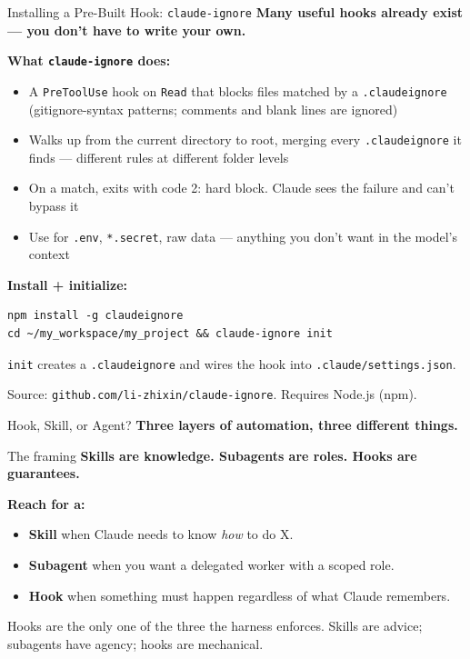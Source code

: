 \documentclass[aspectratio=169, 11pt]{beamer}
\begin{document}
\begin{frame}[fragile]{Installing a Pre-Built Hook: \texttt{claude-ignore}}
  \textbf{Many useful hooks already exist --- you don't have to write your own.}

  \vspace{0.3em}
  \textbf{What \texttt{claude-ignore} does:}
  \begin{itemize}\small
    \item A \texttt{PreToolUse} hook on \texttt{Read} that blocks files matched by a \texttt{.claudeignore} (gitignore-syntax patterns; comments and blank lines are ignored)
    \item Walks up from the current directory to root, merging every \texttt{.claudeignore} it finds --- different rules at different folder levels
    \item On a match, exits with code 2: hard block. Claude sees the failure and can't bypass it
    \item Use for \texttt{.env}, \texttt{*.secret}, raw data --- anything you don't want in the model's context
  \end{itemize}

  \vspace{0.3em}
  \textbf{Install + initialize:}
  \begin{lstlisting}[basicstyle=\ttfamily\small]
npm install -g claudeignore
cd ~/my_workspace/my_project && claude-ignore init
  \end{lstlisting}

  \vspace{0.2em}
  \texttt{init} creates a \texttt{.claudeignore} and wires the hook into \texttt{.claude/settings.json}.

  \vspace{0.2em}
  \alert{\small Source: \texttt{github.com/li-zhixin/claude-ignore}. Requires Node.js (npm).}
\end{frame}

\begin{frame}{Hook, Skill, or Agent?}
  \textbf{Three layers of automation, three different things.}

  \vspace{0.5em}
  \begin{block}{The framing}
    \textbf{Skills are knowledge. Subagents are roles. Hooks are guarantees.}
  \end{block}

  \vspace{0.5em}
  \textbf{Reach for a:}
  \begin{itemize}\small
    \item \textbf{Skill} when Claude needs to know \textit{how} to do X.
    \item \textbf{Subagent} when you want a delegated worker with a scoped role.
    \item \textbf{Hook} when something must happen regardless of what Claude remembers.
  \end{itemize}

  \vspace{0.5em}
  \alert{\small Hooks are the only one of the three the harness enforces. Skills are advice; subagents have agency; hooks are mechanical.}
\end{frame}
\end{document}
